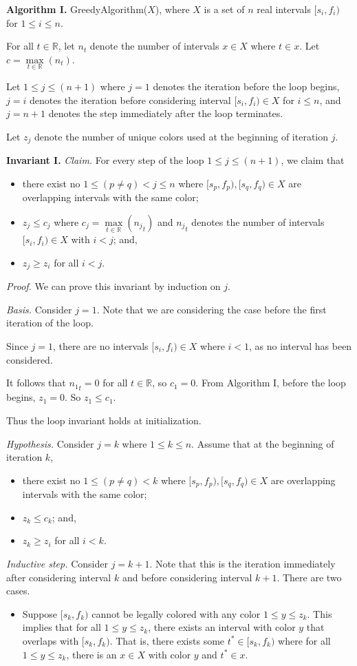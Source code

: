\begin{enumerate}
\begin{solution}
\textbf{Algorithm I. }{\sc GreedyAlgorithm}($X$), where $X$ is a set of $n$ real intervals $[s_i,f_i)$ for $1\leq i\leq n$.

For all $t\in\mathbb{R}$, let $n_t$ denote the number of intervals $x\in X$ where $t\in x$. Let $c=\underset{t\in\mathbb{R}}{\max}(n_t)$. 

Let $1\leq j\leq(n+1)$ where $j=1$ denotes the iteration before the loop begins, $j=i$ denotes the iteration before considering interval $[s_i,f_i)\in X$ for $i\leq n$, and $j=n+1$ denotes the step immediately after the loop terminates.

Let $z_j$ denote the number of unique colors used at the beginning of iteration $j$.

\textbf{Invariant I. }\textit{Claim. }For every step of the loop $1\leq j\leq(n+1)$, we claim that
\begin{itemize}
\item there exist no $1\leq (p\neq q)<j\leq n$ where $[s_p,f_p),[s_q,f_q)\in X$ are overlapping intervals with the same color;
\item$z_j\leq c_j$ where $c_j=\underset{t\in\mathbb{R}}{\max}({n_j}_t)$ and ${n_j}_t$ denotes the number of intervals $[s_i,f_i)\in X$ with $i<j$; and,
\item$z_j\geq z_i$ for all $i<j$.
\end{itemize}
\textit{Proof. }We can prove this invariant by induction on $j$.

\textit{Basis. }Consider $j=1$. Note that we are considering the case before the first iteration of the loop.

Since $j=1$, there are no intervals $[s_i,f_i)\in X$ where $i<1$, as no interval has been considered.

It follows that ${n_1}_t=0$ for all $t\in\mathbb{R}$, so $c_1=0$. From Algorithm I, before the loop begins, $z_1=0$. So $z_1\leq c_1$.

Thus the loop invariant holds at initialization.

\textit{Hypothesis. }Consider $j=k$ where $1\leq k\leq n$. Assume that at the beginning of iteration $k$,
\begin{itemize}
\item there exist no $1\leq (p\neq q)<k$ where $[s_p,f_p),[s_q,f_q)\in X$ are overlapping intervals with the same color;
\item$z_k\leq c_k$; and,
\item$z_k\geq z_i$ for all $i<k$. 
\end{itemize}
\textit{Inductive step. }Consider $j=k+1$. Note that this is the iteration immediately after considering interval $k$ and before considering interval $k+1$. There are two cases.
\begin{itemize}
\item Suppose $[s_k,f_k)$ cannot be legally colored with any color $1\leq y\leq z_k$. This implies that for all $1\leq y\leq z_k$, there exists an interval with color $y$ that overlaps with $[s_k,f_k)$. That is, there exists some $t^*\in[s_k,f_k)$ where for all $1\leq y\leq z_k$, there is an $x\in X$ with color $y$ and $t^*\in x$. 


\end{itemize}
\end{solution}
\end{enumerate}

